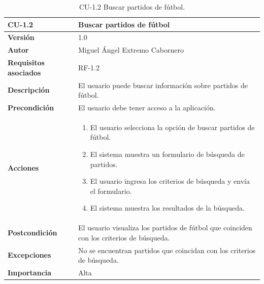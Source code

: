 \begin{table}[p]
    \centering
    \begin{tabularx}{\linewidth}{ p{} p{} }
        \toprule
        \textbf{CU-1.2}    & \textbf{Buscar partidos de fútbol}\\
        \toprule
        \textbf{Versión}              & 1.0    \\
        \textbf{Autor}                & Miguel Ángel Extremo Cabornero \\
        \textbf{Requisitos asociados} & RF-1.2 \\
        \textbf{Descripción}          & El usuario puede buscar información sobre partidos de fútbol. \\
        \textbf{Precondición}         & El usuario debe tener acceso a la aplicación. \\
        \textbf{Acciones}             &
        \begin{enumerate}
            \item El usuario selecciona la opción de buscar partidos de fútbol.
            \item El sistema muestra un formulario de búsqueda de partidos.
            \item El usuario ingresa los criterios de búsqueda y envía el formulario.
            \item El sistema muestra los resultados de la búsqueda.
        \end{enumerate}\\
        \textbf{Postcondición}        & El usuario visualiza los partidos de fútbol que coinciden con los criterios de búsqueda. \\
        \textbf{Excepciones}          & No se encuentran partidos que coincidan con los criterios de búsqueda. \\
        \textbf{Importancia}          & Alta \\
        \bottomrule
    \end{tabularx}
    \caption{CU-1.2 Buscar partidos de fútbol.}
\end{table}


